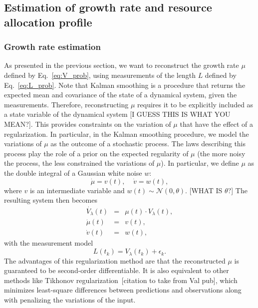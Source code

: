 \subsection{Estimation of growth rate and resource allocation profile}

\subsubsection*{Growth rate estimation}

As presented in the previous section, we want to reconstruct the growth rate $\mu$ defined by Eq.~\ref{eq:V_prob}, using measurements of the length $L$ defined by Eq.~\ref{eq:L_prob}.
Note that Kalman smoothing is a procedure that returns the expected mean and covariance of the state of a dynamical system, given the  measurements.
Therefore, reconstructing $\mu$ requires it to be explicitly included as a state variable of the dynamical system [I GUESS THIS IS WHAT YOU MEAN?].
This provides constraints on the variation of $\mu$ that have the effect of a regularization.
In particular, in the Kalman smoothing procedure, we model the variations of $\mu$ as the outcome of a stochastic process.
The laws describing this process play the role of a prior on the expected regularity of $\mu$ (the more noisy the process, the less constrained the variations of $\mu$).
In particular, we define $\mu$ as the double integral of a Gaussian white noise $w$:
\[
\dot{\mu} = v(t), \;\;\;\; \dot{v} = w(t),
\]
where $v$ is an intermediate variable and $w(t) \sim \mathcal{N}(0, \theta)$. [WHAT IS $\theta$?]
The resulting system then becomes
\begin{eqnarray}
\dot{V_\lambda}(t) &=& \mu (t) \cdot V_\lambda (t),\nonumber\\
\dot{\mu}(t) &=& v(t),\label{eq:full_mu_prob}\\
\dot{v}(t) &=& w(t),\nonumber
\end{eqnarray}
with the measurement model
\begin{equation}
L(t_k) = V_\lambda(t_k) + \epsilon_k.
\end{equation}
The advantages of this regularization method are that the reconstructed $\mu$ is guaranteed to be second-order differentiable.
It is also equivalent to other methods like Tikhonov regularization~[citation to take from Val pub], which minimizes least-square differences between predictions and observations along with penalizing the variations of the input.


